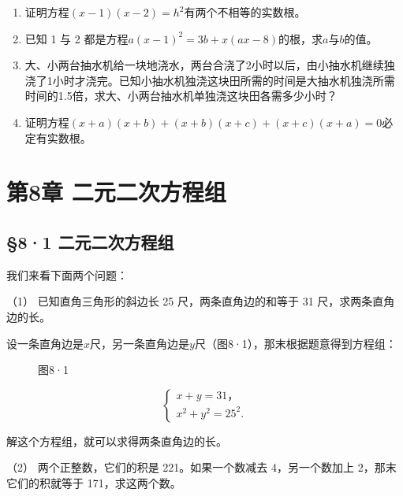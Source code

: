 \begin{enumerate}[start=5]
\item
  证明方程\((x - 1)(x - 2) = h^2\)有两个不相等的实数根。
\item
  已知 1 与 2
  都是方程\(a(x - 1)^2 = 3b + x(ax - 8)\)的根，求\(a\)与\(b\)的值。
\item
  大、小两台抽水机给一块地浇水，两台合浇了2小时以后，由小抽水机继续独浇了1小时才浇完。已知小抽水机独浇这块田所需的时间是大抽水机独浇所需时间的1.5倍，求大、小两台抽水机单独浇这块田各需多少小时？
\item
  证明方程\((x + a)(x + b) + (x + b)(x + c) + (x + c)(x + a) = 0\)必定有实数根。
\end{enumerate}

\chapter{第8章 二元二次方程组}

\section{§8·1 二元二次方程组}

我们来看下面两个问题：

（1） 已知直角三角形的斜边长 25 尺，两条直角边的和等于 31
尺，求两条直角边的长。

设一条直角边是\(x\)尺，另一条直角边是\(y\)尺（图8·1），那末根据题意得到方程组：

\begin{figure}
\centering
{}
\caption{图8·1}
\end{figure}

\[
\left\{ \begin{array}{l} x + y = 31\text{，} \\ x ^ {2} + y ^ {2} = 25 ^ {2}. \end{array} \right. \tag{1}
\]

解这个方程组，就可以求得两条直角边的长。

（2） 两个正整数，它们的积是 221。如果一个数减去 4，另一个数加上
2，那末它们的积就等于 171，求这两个数。

